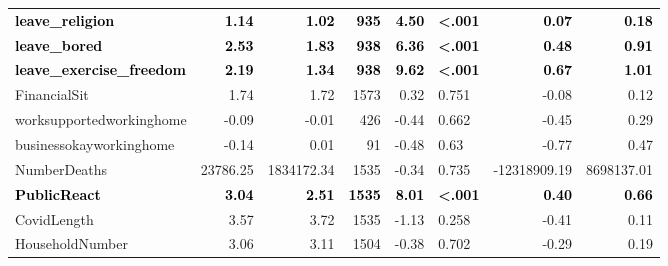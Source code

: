 \documentclass[]{article}
\begin{document}
\begin{table}[H]
\begin{tabular}[t]{lrrrrlrr}
\textcolor{black}{\textbf{leave\_religion}} & \textcolor{black}{\textbf{1.14}} & \textcolor{black}{\textbf{1.02}} & \textcolor{black}{\textbf{935}} & \textcolor{black}{\textbf{4.50}} & \textcolor{black}{\textbf{<.001}} & \textcolor{black}{\textbf{0.07}} & \textcolor{black}{\textbf{0.18}}\\
\textcolor{black}{\textbf{leave\_bored}} & \textcolor{black}{\textbf{2.53}} & \textcolor{black}{\textbf{1.83}} & \textcolor{black}{\textbf{938}} & \textcolor{black}{\textbf{6.36}} & \textcolor{black}{\textbf{<.001}} & \textcolor{black}{\textbf{0.48}} & \textcolor{black}{\textbf{0.91}}\\
\addlinespace
\textcolor{black}{\textbf{leave\_exercise\_freedom}} & \textcolor{black}{\textbf{2.19}} & \textcolor{black}{\textbf{1.34}} & \textcolor{black}{\textbf{938}} & \textcolor{black}{\textbf{9.62}} & \textcolor{black}{\textbf{<.001}} & \textcolor{black}{\textbf{0.67}} & \textcolor{black}{\textbf{1.01}}\\
FinancialSit & 1.74 & 1.72 & 1573 & 0.32 & 0.751 & -0.08 & 0.12\\
worksupportedworkinghome & -0.09 & -0.01 & 426 & -0.44 & 0.662 & -0.45 & 0.29\\
businessokayworkinghome & -0.14 & 0.01 & 91 & -0.48 & 0.63 & -0.77 & 0.47\\
NumberDeaths & 23786.25 & 1834172.34 & 1535 & -0.34 & 0.735 & -12318909.19 & 8698137.01\\
\addlinespace
\textcolor{black}{\textbf{PublicReact}} & \textcolor{black}{\textbf{3.04}} & \textcolor{black}{\textbf{2.51}} & \textcolor{black}{\textbf{1535}} & \textcolor{black}{\textbf{8.01}} & \textcolor{black}{\textbf{<.001}} & \textcolor{black}{\textbf{0.40}} & \textcolor{black}{\textbf{0.66}}\\
CovidLength & 3.57 & 3.72 & 1535 & -1.13 & 0.258 & -0.41 & 0.11\\
HouseholdNumber & 3.06 & 3.11 & 1504 & -0.38 & 0.702 & -0.29 & 0.19\\
\bottomrule
\end{tabular}
\end{table}

\newpage
\end{document}
